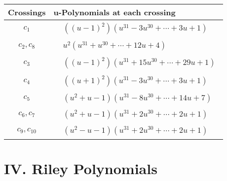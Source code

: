 \documentclass[1p]{elsarticle_modified}
\theoremstyle{definition}
\begin{document}
\begin{tabular}{m{50pt}|m{274pt}}
Crossings & \hspace{64pt}u-Polynomials at each crossing \\
\hline $$\begin{aligned}c_{1}\end{aligned}$$&$\begin{aligned}
&((u-1)^2)(u^{31}-3 u^{30}+\cdots+3 u+1)
\end{aligned}$\\
\hline $$\begin{aligned}c_{2},c_{8}\end{aligned}$$&$\begin{aligned}
&u^2(u^{31}+u^{30}+\cdots+12 u+4)
\end{aligned}$\\
\hline $$\begin{aligned}c_{3}\end{aligned}$$&$\begin{aligned}
&((u-1)^2)(u^{31}+15 u^{30}+\cdots+29 u+1)
\end{aligned}$\\
\hline $$\begin{aligned}c_{4}\end{aligned}$$&$\begin{aligned}
&((u+1)^2)(u^{31}-3 u^{30}+\cdots+3 u+1)
\end{aligned}$\\
\hline $$\begin{aligned}c_{5}\end{aligned}$$&$\begin{aligned}
&(u^2+u-1)(u^{31}-8 u^{30}+\cdots+14 u+7)
\end{aligned}$\\
\hline $$\begin{aligned}c_{6},c_{7}\end{aligned}$$&$\begin{aligned}
&(u^2+u-1)(u^{31}+2 u^{30}+\cdots+2 u+1)
\end{aligned}$\\
\hline $$\begin{aligned}c_{9},c_{10}\end{aligned}$$&$\begin{aligned}
&(u^2- u-1)(u^{31}+2 u^{30}+\cdots+2 u+1)
\end{aligned}$\\
\hline
\end{tabular}\newpage\renewcommand{\arraystretch}{1}
\centering \section*{ IV. Riley Polynomials}
\end{document}
